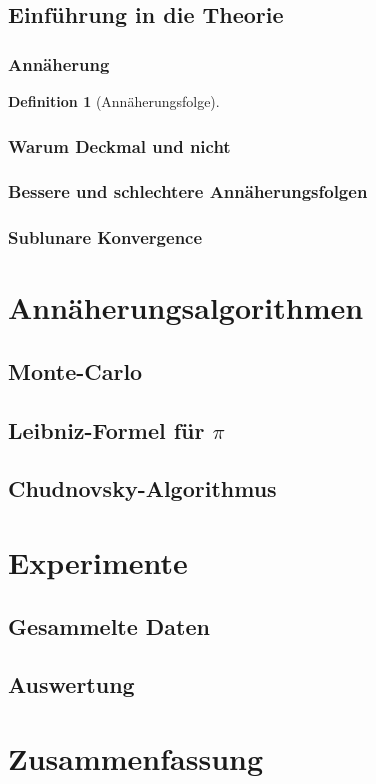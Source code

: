 \documentclass{scrartcl}
\newtheorem{definition}{Definition}
\begin{document}
\subsection{Einführung in die Theorie}
\subsubsection{Annäherung}

\begin{definition}[Annäherungsfolge]

\end{definition}

\subsubsection{Warum Deckmal und nicht }

\subsubsection{Bessere und schlechtere Annäherungsfolgen}

\subsubsection{Sublunare Konvergence}

\section{Annäherungsalgorithmen}

\subsection{Monte-Carlo}

\subsection{Leibniz-Formel für \(\pi\)}

\subsection{Chudnovsky-Algorithmus}

\section{Experimente}

\subsection{Gesammelte Daten}

\subsection{Auswertung}

\section{Zusammenfassung}

\printbibliography
\end{document}
